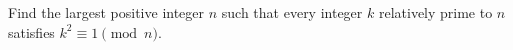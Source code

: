 Find the largest positive integer $n$ such that every integer $k$ relatively prime to $n$ satisfies $k^2\equiv1\pmod n$.
